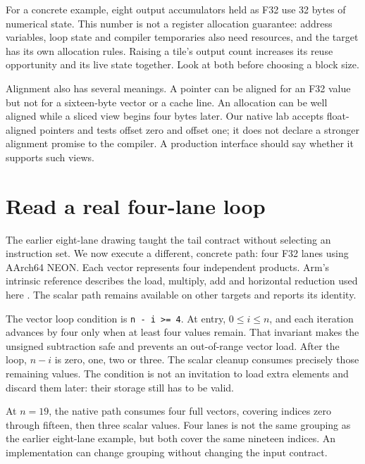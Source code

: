 For a concrete example, eight output accumulators held as F32
use 32 bytes of numerical state. This number is not a register
allocation guarantee: address variables, loop state and compiler
temporaries also need resources, and the target has its own
allocation rules. Raising a tile's output count increases its
reuse opportunity and its live state together. Look at both
before choosing a block size.

Alignment also has several meanings. A pointer can be aligned
for an F32 value but not for a sixteen-byte vector or a cache
line. An allocation can be well aligned while a sliced view
begins four bytes later. Our native lab accepts float-aligned
pointers and tests offset zero and offset one; it does not
declare a stronger alignment promise to the compiler. A
production interface should say whether it supports such views.

\section{Read a real four-lane loop}
The earlier eight-lane drawing taught the tail contract without
selecting an instruction set. We now execute a different, concrete
path: four F32 lanes using AArch64 NEON. Each vector represents
four independent products. Arm's intrinsic reference describes
the load, multiply, add and horizontal reduction used here
\cite{arm2026neon}. The scalar path remains available on other
targets and reports its identity.

\begin{minipage}{\linewidth}
\end{minipage}

The vector loop condition is \texttt{n - i >= 4}. At entry,
$0\leq i\leq n$, and each iteration advances by four only
when at least four values remain. That invariant makes the
unsigned subtraction safe and prevents an out-of-range vector
load. After the loop, $n-i$ is zero, one, two or three.
The scalar cleanup consumes precisely those remaining values.
The condition is not an invitation to load extra elements
and discard them later: their storage still has to be valid.

At $n=19$, the native path consumes four full vectors, covering
indices zero through fifteen, then three scalar values. Four
lanes is not the same grouping as the earlier eight-lane example,
but both cover the same nineteen indices. An implementation
can change grouping without changing the input contract.

